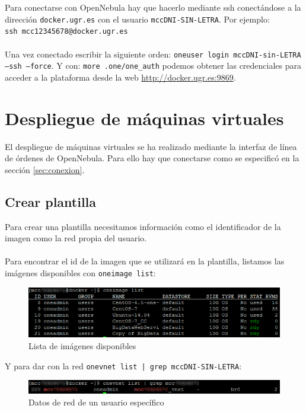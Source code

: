 Para conectarse con OpenNebula hay que hacerlo mediante ssh conectándose a la dirección \texttt{docker.ugr.es} con el usuario \texttt{mccDNI-SIN-LETRA}. Por ejemplo:
\\
\texttt{ssh mcc12345678@docker.ugr.es}
\\ \\
Una vez conectado escribir la siguiente orden: \texttt{oneuser login mccDNI-sin-LETRA --ssh --force}. Y con: \texttt{more .one/one\_auth} podemos obtener las credenciales para acceder a la plataforma desde la web \url{http://docker.ugr.es:9869}.

\section{Despliegue de máquinas virtuales}

El despliegue de máquinas virtuales se ha realizado mediante la interfaz de línea de órdenes de OpenNebula. Para ello hay que conectarse como se especificó en la sección \ref{sec:conexion}.

\label{sec:crear-plantilla}
\subsection{Crear plantilla}

Para crear una plantilla necesitamos información como el identificador de la imagen como la red propia del usuario.
\\ \\
Para encontrar el id de la imagen que se utilizará en la plantilla, listamos las imágenes disponibles con \texttt{oneimage list}:

\begin{figure}[H]
	\centering
	\includegraphics[width=14cm]{img/oneimage-list}
	\caption{Lista de imágenes disponibles}
	\label{fig:one-image-list}
\end{figure}

Y para dar con la red \texttt{onevnet list | grep mccDNI-SIN-LETRA}:

\begin{figure}[H]
	\centering
	\includegraphics[width=14cm]{img/onevnet-list}
	\caption{Datos de red de un usuario específico}
	\label{fig:onevnet-list}
\end{figure}

